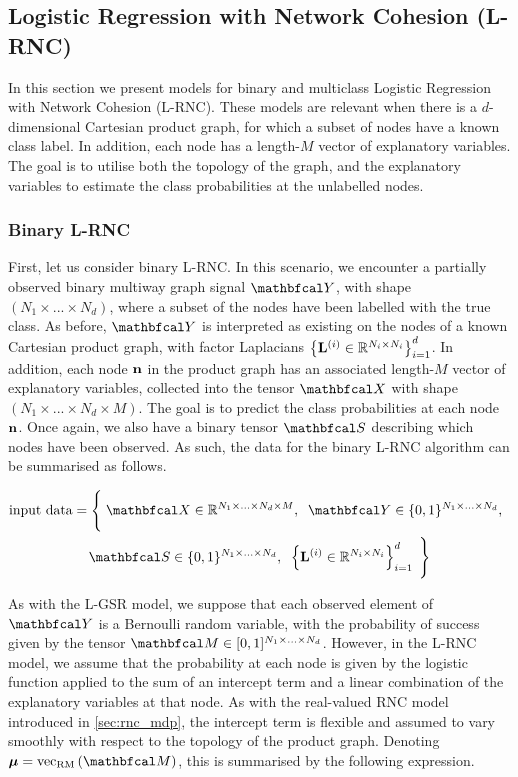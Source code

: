 \subsection{Logistic Regression with Network Cohesion (L-RNC)}

\label{sec:lrnc}

In this section we present models for binary and multiclass Logistic Regression with Network Cohesion (L-RNC). These models are relevant when there is a $d$-dimensional Cartesian product graph, for which a subset of nodes have a known class label. In addition, each node has a length-$M$ vector of explanatory variables. The goal is to utilise both the topology of the graph, and the explanatory variables to estimate the class probabilities at the unlabelled nodes. 

\subsubsection{Binary L-RNC}

First, let us consider binary L-RNC. In this scenario, we encounter a partially observed binary multiway graph signal $\Yt$, with shape $(N_1 \times ... \times N_d)$, where a subset of the nodes have been labelled with the true class. As before, $\Yt$ is interpreted as existing on the nodes of a known Cartesian product graph, with factor Laplacians $\left\{\mathbf{L}^{(i)} \in \mathbb{R}^{N_i \times N_i}\right\}_{i=1}^d$. In addition, each node $\mathbf{n}$ in the product graph has an associated length-$M$ vector of explanatory variables, collected into the tensor $\Xt$ with shape $(N_1 \times ... \times N_d \times M)$. The goal is to predict the class probabilities at each node $\mathbf{n}$. Once again, we also have a binary tensor $\St$ describing which nodes have been observed. As such, the data for the binary L-RNC algorithm can be summarised as follows. 

\begin{multline*}
    \text{input data} = \Bigg\{\;\Xt \in \R^{N_1 \times ... \times N_d \times M}, \;\; \Yt \in \{0, 1\}^{N_1 \times ... \times N_d}, \;\; \\ 
    \St \in \{0, 1\}^{N_1 \times ... \times N_d} , \;\; \left\{\LL^{(i)} \in \R^{N_i \times N_i}\right\}_{i=1}^d \; \Bigg\}
\end{multline*}

As with the L-GSR model, we suppose that each observed element of $\Yt$ is a Bernoulli random variable, with the probability of success given by the tensor $\Mt \in [0, 1]^{N_1 \times ... \times N_d}$. However, in the L-RNC model, we assume that the probability at each node is given by the logistic function applied to the sum of an intercept term and a linear combination of the explanatory variables at that node. As with the real-valued RNC model introduced in \cref{sec:rnc_mdp}, the intercept term is flexible and assumed to vary smoothly with respect to the topology of the product graph. Denoting $\muu = \vecrm{\Mt}$, this is summarised by the following expression. 


